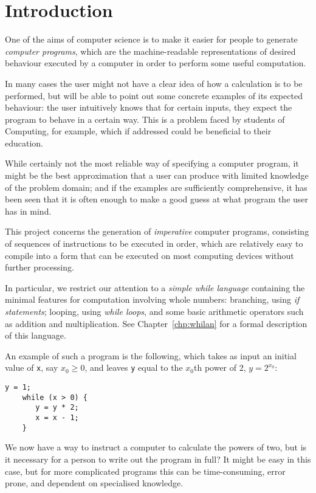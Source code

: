 \documentclass[a4paper,twoside,notitlepage]{report}
\begin{document}
\tableofcontents

\chapter{Introduction} \label{chp:intro}

One of the aims of computer science is to make it easier for people to 
generate \emph{computer programs}, which are the machine-readable 
representations of desired behaviour executed by a computer in order to 
perform some useful computation.

In many cases the user might not have a clear idea of how a calculation is 
to be performed, but will be able to point out some concrete examples of 
its expected behaviour: the user intuitively knows that for certain 
inputs, they expect the program to behave in a certain way. This is a 
problem faced by students of Computing, for example, which if addressed 
could be beneficial to their education.

While certainly not the most reliable way of specifying a computer 
program, it might be the best approximation that a user can produce with 
limited knowledge of the problem domain; and if the examples are 
sufficiently comprehensive, it has been seen that it is often enough to 
make a good guess at what program the user has in mind.

This project concerns the generation of \emph{imperative} computer 
programs, consisting of sequences of instructions to be executed in order, 
which are relatively easy to compile into a form that can be executed on 
most computing devices without further processing.

In particular, we restrict our attention to a \emph{simple while language} 
containing the minimal features for computation involving whole numbers: 
branching, using \emph{if statements}; looping, using \emph{while loops}, 
and some basic arithmetic operators such as addition and multiplication.
See Chapter~\ref{chp:whilan} for a formal description of this language.

An example of such a program is the following, which takes as input an initial 
value of \texttt{x}, say $x_0 \ge 0$, and leaves \texttt{y} equal to the 
$x_0$th power of 2, $y = 2^{x_0}$:
\begin{Verbatim}[samepage=true]
    y = 1;
    while (x > 0) {
       y = y * 2;
       x = x - 1;
    }
\end{Verbatim}

We now have a way to instruct a computer to calculate the powers of two, 
but is it necessary for a person to write out the program in full? It 
might be easy in this case, but for more complicated programs this can be 
time-consuming, error prone, and dependent on specialised knowledge.
\end{document}
